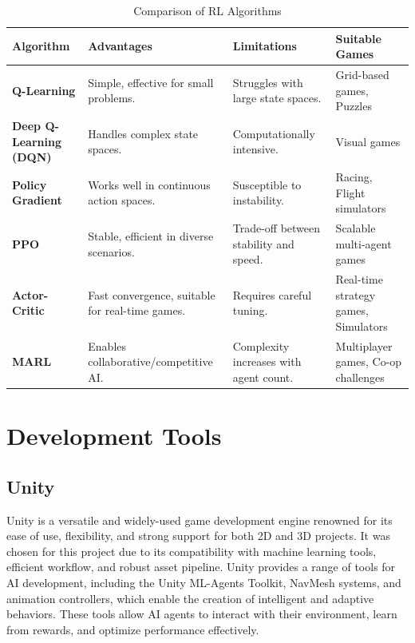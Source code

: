 \documentclass[12pt,oneside,openright,a4paper]{cpe-english-project}
\begin{document}
\begin{table}[H]
\caption{Comparison of RL Algorithms}\label{tbl:ComparisonofRLAlgorithms}
\renewcommand{\arraystretch}{1.5} %
\setlength{\tabcolsep}{4pt} %
\begin{tabularx}{\textwidth}{|>{\raggedright\arraybackslash}X|>{\raggedright\arraybackslash}X|>{\raggedright\arraybackslash}X|>{\raggedright\arraybackslash}X|}
\hline
\textbf{Algorithm} & \textbf{Advantages} & \textbf{Limitations} & \textbf{Suitable Games} \\ \hline
\textbf{Q-Learning} & Simple, effective for small problems. & Struggles with large state spaces. & Grid-based games, Puzzles \\ \hline
\textbf{Deep Q-Learning (DQN)} & Handles complex state spaces. & Computationally intensive. & Visual games \\ \hline
\textbf{Policy Gradient} & Works well in continuous action spaces. & Susceptible to instability. & Racing, Flight simulators \\ \hline
\textbf{PPO} & Stable, efficient in diverse scenarios. & Trade-off between stability and speed. & Scalable multi-agent games \\ \hline
\textbf{Actor-Critic} & Fast convergence, suitable for real-time games. & Requires careful tuning. & Real-time strategy games, Simulators \\ \hline
\textbf{MARL} & Enables collaborative/competitive AI. & Complexity increases with agent count. & Multiplayer games, Co-op challenges \\ \hline
\end{tabularx}
\end{table}

\section{Development Tools}

\subsection{Unity}
Unity is a versatile and widely-used game development engine renowned for its ease of use, flexibility, and strong support for both 2D and 3D projects. It was chosen for this project due to its compatibility with machine learning tools, efficient workflow, and robust asset pipeline. Unity provides a range of tools for AI development, including the Unity ML-Agents Toolkit, NavMesh systems, and animation controllers, which enable the creation of intelligent and adaptive behaviors. These tools allow AI agents to interact with their environment, learn from rewards, and optimize performance effectively.
\end{document}
